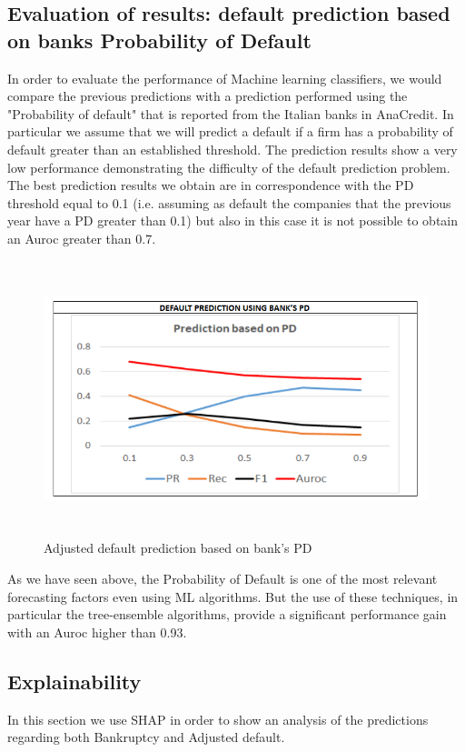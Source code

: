 \subsection{Evaluation of results: default prediction based on banks Probability of Default}

In order to evaluate the performance of Machine learning classifiers, we would compare the previous predictions with a prediction performed using the "Probability of default" that is reported from the Italian banks in AnaCredit. In particular we assume that we will predict a default if a firm has a probability of default greater than an established threshold.
The prediction results show a very low performance demonstrating the difficulty of the default prediction problem. The best prediction results we obtain are in correspondence with the PD threshold equal to 0.1 (i.e. assuming as default the companies that the previous year have a PD greater than 0.1) but also in this case it is not possible to obtain an Auroc greater than 0.7.


\begin{figure}[H]

\includegraphics[width=120mm, height=80mm]{figs/PD.png}

\caption{Adjusted default prediction based on bank's PD}
\end{figure}

As we have seen above, the Probability of Default is one of the most relevant forecasting factors even using ML algorithms. But the use of these techniques, in particular the tree-ensemble algorithms, provide a significant performance gain with an Auroc higher than 0.93.


\subsection{Explainability}
In this section we use SHAP in order to show an analysis of the predictions regarding both Bankruptcy and Adjusted default.

